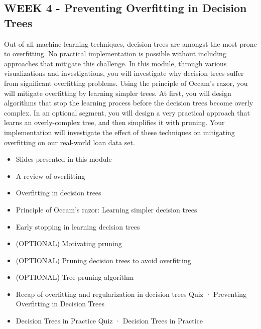 \subsection{WEEK 4 - Preventing Overfitting in Decision Trees}
Out of all machine learning techniques, decision trees are amongst the most prone to overfitting. No practical implementation is possible without including approaches that mitigate this challenge. In this module, through various visualizations and investigations, you will investigate why decision trees suffer from significant overfitting problems. Using the principle of Occam's razor, you will mitigate overfitting by learning simpler trees. At first, you will design algorithms that stop the learning process before the decision trees become overly complex. In an optional segment, you will design a very practical approach that learns an overly-complex tree, and then simplifies it with pruning. Your implementation will investigate the effect of these techniques on mitigating overfitting on our real-world loan data set.
\begin{itemize}
\item Slides presented in this module
\item A review of overfitting
\item Overfitting in decision trees
\item Principle of Occam's razor: Learning simpler decision trees
\item Early stopping in learning decision trees
\item (OPTIONAL) Motivating pruning
\item (OPTIONAL) Pruning decision trees to avoid overfitting
\item (OPTIONAL) Tree pruning algorithm
\item Recap of overfitting and regularization in decision trees
Quiz · Preventing Overfitting in Decision Trees
\item Decision Trees in Practice
Quiz · Decision Trees in Practice
\end{itemize}

